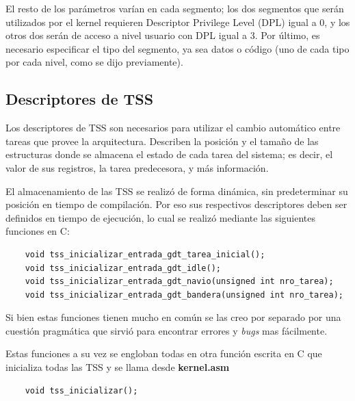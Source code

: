	El resto de los parámetros varían en cada segmento; los dos segmentos que serán utilizados por el 
kernel requieren Descriptor Privilege Level (DPL) igual a 0, y los otros dos serán de acceso a nivel usuario con DPL igual a 3. Por último, es necesario especificar el tipo del segmento, ya sea datos o código (uno de cada tipo por cada nivel, como se dijo previamente).

\subsection{Descriptores de TSS}

	Los descriptores de TSS son necesarios para utilizar el cambio automático entre tareas 
que provee la arquitectura. Describen la posición y el tamaño de las estructuras donde se almacena 
el estado de cada tarea del sistema; es decir, el valor de sus registros, la tarea predecesora, y más información.

	El almacenamiento de las TSS se realizó de forma dinámica, sin predeterminar su posición en 
tiempo de compilación. Por eso sus respectivos descriptores deben ser definidos en tiempo de 
ejecución, lo cual se realizó mediante las siguientes funciones en C:

\begin{verbatim}
	void tss_inicializar_entrada_gdt_tarea_inicial();
	void tss_inicializar_entrada_gdt_idle();
	void tss_inicializar_entrada_gdt_navio(unsigned int nro_tarea);
	void tss_inicializar_entrada_gdt_bandera(unsigned int nro_tarea);
\end{verbatim}

	Si bien estas funciones tienen mucho en común se las creo por separado
por una cuestión pragmática que sirvió para encontrar errores y \textit{bugs} mas
fácilmente.

	Estas funciones a su vez se engloban todas en otra función escrita en C que
inicializa todas las TSS y se llama desde \textbf{kernel.asm}

\begin{verbatim}
	void tss_inicializar();
\end{verbatim}

